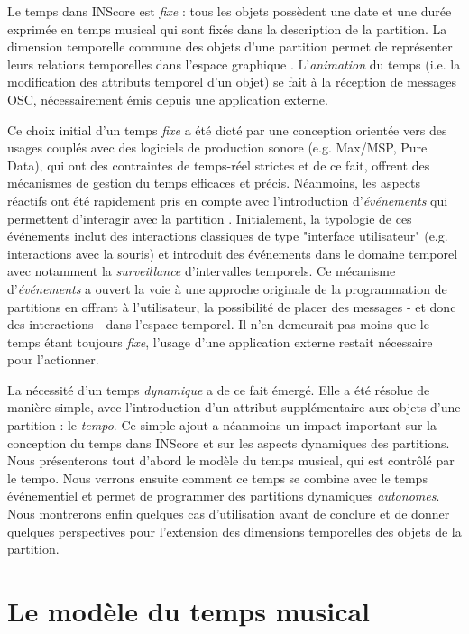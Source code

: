 \documentclass{article}
\begin{document}
Le temps dans INScore \cite{Fober:12a} est \emph{fixe} : tous les objets possèdent une date et une durée exprimée en temps musical qui sont fixés dans la description de la partition. La dimension temporelle commune des objets d'une partition  permet de représenter leurs relations temporelles dans l'espace graphique \cite{fober:10b}. L'\emph{animation} du temps (i.e. la modification des attributs temporel d'un objet) se fait à la réception de messages OSC, nécessairement émis depuis une application externe.

Ce choix initial d'un temps \emph{fixe} a été dicté par une conception orientée vers des usages couplés avec des logiciels de production sonore (e.g. Max/MSP, Pure Data), qui ont des contraintes de temps-réel strictes et de ce fait, offrent des mécanismes de gestion du temps efficaces et précis. Néanmoins, les aspects réactifs ont été rapidement pris en compte avec l'introduction d'\textit{événements} qui permettent d'interagir avec la partition \cite{fober13a}. Initialement, la typologie de ces événements inclut des interactions classiques de type "interface utilisateur" (e.g. interactions avec la souris) et introduit des événements dans le domaine temporel avec notamment la \textit{surveillance} d'intervalles temporels. Ce mécanisme d'\textit{événements} a ouvert la voie à une approche originale de la programmation de partitions en offrant à l'utilisateur, la possibilité de placer des messages - et donc des interactions - dans l'espace temporel. Il n'en demeurait pas moins que le temps étant toujours \emph{fixe}, l'usage d'une application externe restait nécessaire pour l'actionner.

La nécessité d'un temps \emph{dynamique} a de ce fait émergé. Elle a été résolue de manière simple, avec l'introduction d'un attribut supplémentaire aux objets d'une partition : le \emph{tempo}. Ce simple ajout a néanmoins un impact important sur la conception du temps dans INScore et sur les aspects dynamiques des partitions. Nous présenterons tout d'abord le modèle du temps musical, qui est contrôlé par le tempo. Nous verrons ensuite comment ce temps se combine avec le temps événementiel et permet de programmer des partitions dynamiques \emph{autonomes}. Nous montrerons enfin quelques cas d'utilisation avant de conclure et de donner quelques perspectives pour l'extension des dimensions temporelles des objets de la partition.


\section{Le modèle du temps musical}\label{mustime}
\end{document}
